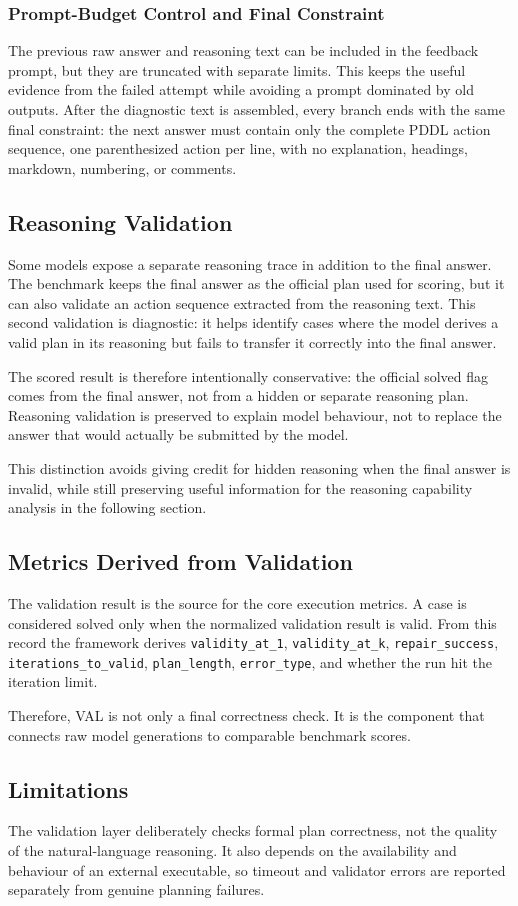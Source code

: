 \subsubsection{Prompt-Budget Control and Final Constraint}
The previous raw answer and reasoning text can be included in the feedback
prompt, but they are truncated with separate limits. This keeps the useful
evidence from the failed attempt while avoiding a prompt dominated by old
outputs. After the diagnostic text is assembled, every branch ends with the same
final constraint: the next answer must contain only the complete PDDL action
sequence, one parenthesized action per line, with no explanation, headings,
markdown, numbering, or comments.

\subsection{Reasoning Validation}
Some models expose a separate reasoning trace in addition to the final answer.
The benchmark keeps the final answer as the official plan used for scoring, but
it can also validate an action sequence extracted from the reasoning text. This
second validation is diagnostic: it helps identify cases where the model derives
a valid plan in its reasoning but fails to transfer it correctly into the final
answer.

The scored result is therefore intentionally conservative: the official solved
flag comes from the final answer, not from a hidden or separate reasoning plan.
Reasoning validation is preserved to explain model behaviour, not to replace
the answer that would actually be submitted by the model.

This distinction avoids giving credit for hidden reasoning when the final answer
is invalid, while still preserving useful information for the reasoning
capability analysis in the following section.

\subsection{Metrics Derived from Validation}

The validation result is the source for the core execution metrics. A case is
considered solved only when the normalized validation result is valid. From this
record the framework derives \texttt{validity\_at\_1},
\texttt{validity\_at\_k}, \texttt{repair\_success},
\texttt{iterations\_to\_valid}, \texttt{plan\_length},
\texttt{error\_type}, and whether the run hit the iteration limit.

Therefore, VAL is not only a final correctness check. It is the component that
connects raw model generations to comparable benchmark scores.

\subsection{Limitations}

The validation layer deliberately checks formal plan correctness, not the
quality of the natural-language reasoning. It also depends on the availability
and behaviour of an external executable, so timeout and validator errors are
reported separately from genuine planning failures.

